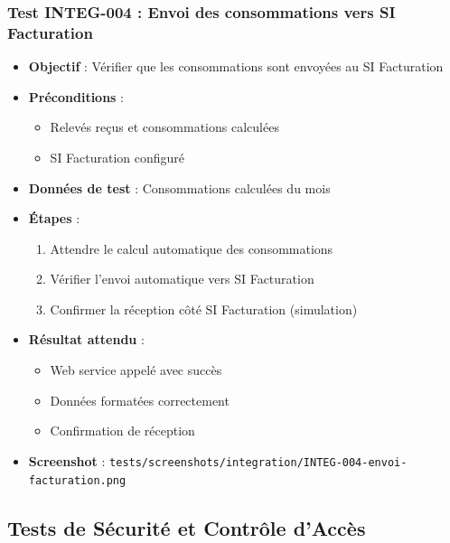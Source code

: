 \subsubsection{Test INTEG-004 : Envoi des consommations vers SI Facturation}
\begin{itemize}
    \item \textbf{Objectif} : Vérifier que les consommations sont envoyées au SI Facturation
    \item \textbf{Préconditions} : 
        \begin{itemize}
            \item Relevés reçus et consommations calculées
            \item SI Facturation configuré
        \end{itemize}
    \item \textbf{Données de test} : Consommations calculées du mois
    \item \textbf{Étapes} :
        \begin{enumerate}
            \item Attendre le calcul automatique des consommations
            \item Vérifier l'envoi automatique vers SI Facturation
            \item Confirmer la réception côté SI Facturation (simulation)
        \end{enumerate}
    \item \textbf{Résultat attendu} : 
        \begin{itemize}
            \item Web service appelé avec succès
            \item Données formatées correctement
            \item Confirmation de réception
        \end{itemize}
    \item \textbf{Screenshot} : \texttt{tests/screenshots/integration/INTEG-004-envoi-facturation.png}
\end{itemize}

\subsection{Tests de Sécurité et Contrôle d'Accès}


